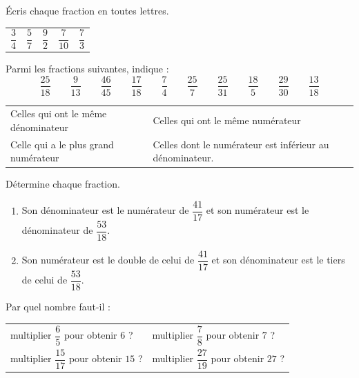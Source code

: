 \documentclass[a4paper,10pt]{report}
\begin{document}
\begin{ex}
Écris chaque fraction en toutes lettres.
\begin{enumerate}
\begin{tabular}{m{3cm}m{3cm}m{3cm}m{3cm}m{3cm}}
\item $\dfrac{3}{4}$&
\item $\dfrac{5}{7}$&
\item $\dfrac{9}{2}$&
\item $\dfrac{7}{10}$&
\item $\dfrac{7}{3}$\\
\end{tabular}
\end{enumerate}
\end{ex}

\begin{ex}
Parmi les fractions suivantes, indique :
$$\dfrac{25}{18} \quad\quad \dfrac{9}{13} \quad\quad \dfrac{46}{45} \quad\quad \dfrac{17}{18} \quad\quad \dfrac{7}{4} \quad\quad \dfrac{25}{7} \quad\quad \dfrac{25}{31} \quad\quad \dfrac{18}{5} \quad\quad \dfrac{29}{30} \quad\quad \dfrac{13}{18}$$
\begin{enumerate}
\begin{tabular}{m{6.5cm}m{8.5cm}}
\item Celles qui ont le même dénominateur &
\item Celles qui ont le même numérateur \\
\item Celle qui a le plus grand numérateur &
\item Celles dont le numérateur est inférieur au dénominateur.\\
\end{tabular}
\end{enumerate}
\end{ex}

\begin{ex}
Détermine chaque fraction.
\begin{enumerate}
\item Son dénominateur est le numérateur de $\dfrac{41}{17}$ et son numérateur est le dénominateur de $\dfrac{53}{18}$.
\item Son numérateur est le double de celui de $\dfrac{41}{17}$ et son dénominateur est le tiers de celui de $\dfrac{53}{18}$.
\end{enumerate}
\end{ex}

\begin{ex}
Par quel nombre faut-il :
\begin{enumerate}
\begin{tabular}{m{7cm}m{7cm}}
\item multiplier $\dfrac{6}{5}$ pour obtenir $6$ ?&
\item multiplier $\dfrac{7}{8}$ pour obtenir $7$ ?\\
\item multiplier $\dfrac{15}{17}$ pour obtenir $15$ ?&
\item multiplier $\dfrac{27}{19}$ pour obtenir $27$ ?\\
\end{tabular}
\end{enumerate}
\end{ex}
\end{document}
